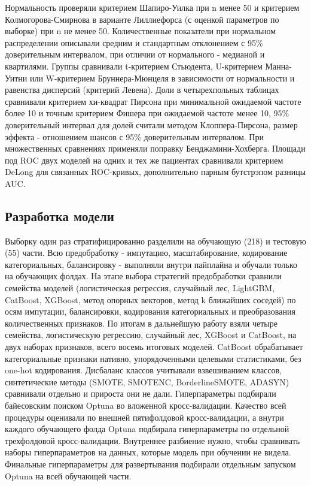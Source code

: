 \documentclass[12pt,a4paper]{article}
\begin{document}
Нормальность проверяли критерием Шапиро-Уилка при n менее 50 и критерием
Колмогорова-Смирнова в варианте Лиллиефорса (с оценкой параметров по выборке) при n не менее
50. Количественные показатели при нормальном распределении описывали средним и стандартным
отклонением с 95\% доверительным интервалом, при отличии от нормального - медианой и
квартилями. Группы сравнивали t-критерием Стьюдента, U-критерием Манна-Уитни или
W-критерием Бруннера-Мюнцеля в зависимости от нормальности и равенства дисперсий (критерий
Левена). Доли в четырехпольных таблицах сравнивали критерием хи-квадрат Пирсона при
минимальной ожидаемой частоте более 10 и точным критерием Фишера при ожидаемой частоте
менее 10, 95\% доверительный интервал для долей считали методом Клоппера-Пирсона, размер эффекта -
отношением шансов с 95\% доверительным интервалом. При множественных сравнениях применяли
поправку Бенджамини-Хохберга. Площади под ROC двух моделей на одних и тех же пациентах
сравнивали критерием DeLong для связанных ROC-кривых, дополнительно парным бутстрэпом
разницы AUC.

\subsection{Разработка модели}

Выборку один раз стратифицированно разделили на обучающую (218) и тестовую (55) части. Всю
предобработку - импутацию, масштабирование, кодирование категориальных, балансировку -
выполняли внутри пайплайна и обучали только на обучающих фолдах. На этапе выбора стратегий
предобработки сравнили семейства моделей (логистическая регрессия, случайный лес, LightGBM,
CatBoost, XGBoost, метод опорных векторов, метод k ближайших соседей) по осям импутации,
балансировки, кодирования категориальных и преобразования количественных признаков. По
итогам в дальнейшую работу взяли четыре семейства, логистическую регрессию, случайный лес,
XGBoost и CatBoost, на двух наборах признаков, всего восемь итоговых моделей. CatBoost
обрабатывает категориальные признаки нативно, упорядоченными целевыми статистиками, без
one-hot кодирования. Дисбаланс классов учитывали взвешиванием классов, синтетические методы
(SMOTE, SMOTENC, BorderlineSMOTE, ADASYN) сравнивали отдельно и прироста они не дали.
Гиперпараметры подбирали байесовским поиском Optuna во вложенной кросс-валидации. Качество
всей процедуры оценивали по внешней пятифолдовой кросс-валидации, а внутри каждого
обучающего фолда Optuna подбирала гиперпараметры по отдельной трехфолдовой
кросс-валидации. Внутреннее разбиение нужно, чтобы сравнивать наборы гиперпараметров на
данных, которые модель при обучении не видела. Финальные гиперпараметры для развертывания
подбирали отдельным запуском Optuna на всей обучающей части.
\end{document}
